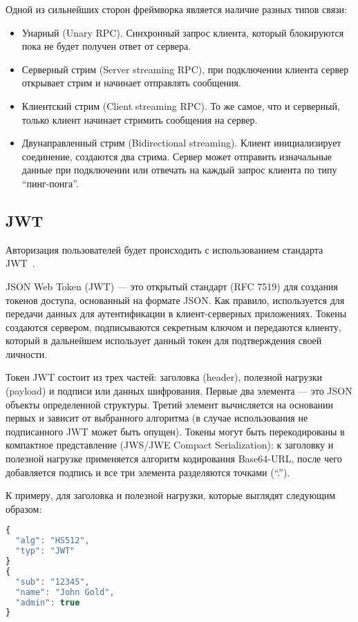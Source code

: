 Одной из сильнейших сторон фреймворка является наличие разных типов связи:
\begin{itemize}
    \item Унарный (Unary RPC). Синхронный запрос клиента, который блокируются пока не будет получен ответ от сервера.
    \item Серверный стрим (Server streaming RPC), при подключении клиента сервер открывает стрим и начинает отправлять сообщения.
    \item Клиентский стрим (Client streaming RPC). То же самое, что и серверный, только клиент начинает стримить сообщения на сервер.
    \item Двунаправленный стрим (Bidirectional streaming). Клиент инициализирует соединение, создаются два стрима. Сервер может отправить изначальные данные при подключении или отвечать на каждый запрос клиента по типу “пинг-понга”.
\end{itemize}

\subsection{JWT}

Авторизация пользователей будет происходить с использованием стандарта JWT~\cite{jwt}.

JSON Web Token (JWT) — это открытый стандарт (RFC 7519) для создания токенов доступа, основанный на формате JSON. Как правило, используется для передачи данных для аутентификации в клиент-серверных приложениях. Токены создаются сервером, подписываются секретным ключом и передаются клиенту, который в дальнейшем использует данный токен для подтверждения своей личности.

Токен JWT состоит из трех частей: заголовка (header), полезной нагрузки (payload) и подписи или данных шифрования. Первые два элемента — это JSON объекты определенной структуры. Третий элемент вычисляется на основании первых и зависит от выбранного алгоритма (в случае использования не подписанного JWT может быть опущен). Токены могут быть перекодированы в компактное представление (JWS/JWE Compact Serialization): к заголовку и полезной нагрузке применяется алгоритм кодирования Base64-URL, после чего добавляется подпись и все три элемента разделяются точками (``.'').

К примеру, для заголовка и полезной нагрузки, которые выглядят следующим образом:

\begin{lstlisting}[language=javascript]
{
  "alg": "HS512",
  "typ": "JWT"
}
{
  "sub": "12345",
  "name": "John Gold",
  "admin": true
}
\end{lstlisting}

